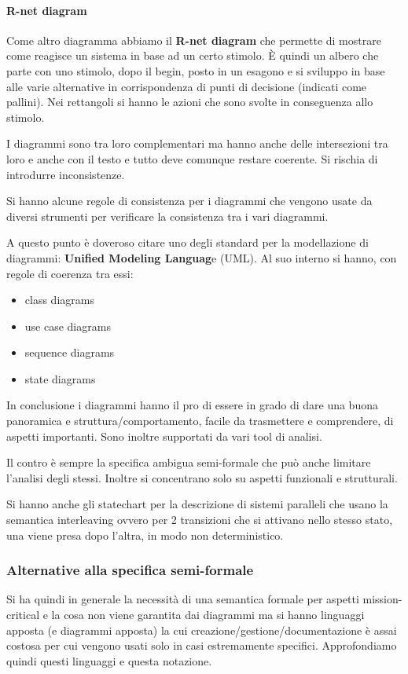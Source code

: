 \paragraph{R-net diagram}
Come altro diagramma abbiamo il \textbf{R-net diagram} che permette di mostrare
come reagisce un sistema in base ad un certo stimolo. È quindi un albero che parte
con uno stimolo, dopo il begin, posto in un esagono e si sviluppo in base alle
varie alternative in corrispondenza di punti di decisione (indicati come pallini).
Nei rettangoli si hanno le azioni che sono svolte in conseguenza allo stimolo.

I diagrammi sono tra loro complementari ma hanno anche delle intersezioni tra
loro e anche con il testo e tutto deve comunque restare coerente. Si rischia di
introdurre inconsistenze.

Si hanno alcune regole di consistenza per i diagrammi che vengono usate da diversi
strumenti per verificare la consistenza tra i vari diagrammi.

A questo punto è doveroso citare uno degli standard per la modellazione di
diagrammi: \textbf{Unified Modeling Languag}e (UML). Al suo interno si hanno, con regole di coerenza tra essi:
\begin{itemize}
    \item class diagrams
    \item use case diagrams
    \item sequence diagrams
    \item state diagrams
\end{itemize}

In conclusione i diagrammi hanno il pro di essere in grado di dare una buona panoramica
e struttura/comportamento, facile da trasmettere e comprendere, di aspetti importanti.
Sono inoltre supportati da vari tool di analisi.

Il contro è sempre la specifica ambigua semi-formale che può anche limitare l'analisi
degli stessi. Inoltre si concentrano solo su aspetti funzionali e strutturali.

Si hanno anche gli statechart per la descrizione di sistemi paralleli che usano
la semantica interleaving ovvero per 2 transizioni che si attivano nello stesso
stato, una viene presa dopo l'altra, in modo non deterministico.
\subsubsection{Alternative alla specifica semi-formale}
Si ha quindi in generale la necessità di una semantica formale per aspetti
mission-critical e la cosa non viene garantita dai diagrammi ma si hanno linguaggi
apposta (e diagrammi apposta) la cui creazione/gestione/documentazione è assai
costosa per cui vengono usati solo in casi estremamente specifici. Approfondiamo
quindi questi linguaggi e questa notazione.

